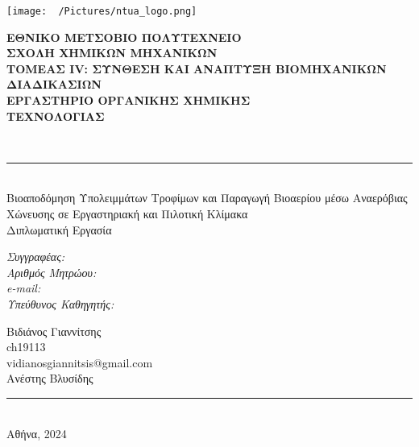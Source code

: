 \documentclass[11pt]{report}
\newcommand{\HRule}{\rule{\linewidth}{0.5mm}}
\begin{document}
\renewcommand{\contentsname}{Κεφάλαια: }
\begin{titlepage}

\begin{center}
  \begin{minipage}{0.2\textwidth}
    \begin{flushleft}
      \texttt{[image: ~/Pictures/ntua\_logo.png]}\\[0.4cm]    
    \end{flushleft}
  \end{minipage}
  \begin{minipage}{0.75\textwidth}
    \textsc{\bfseries \Large ΕΘΝΙΚΟ ΜΕΤΣΟΒΙΟ ΠΟΛΥΤΕΧΝΕΙΟ}\\[0.2cm]
    \textsc{\bfseries \Large ΣΧΟΛΗ ΧΗΜΙΚΩΝ ΜΗΧΑΝΙΚΩΝ}\\[0.2cm]
    \textsc{\large \bfseries ΤΟΜΕΑΣ IV: ΣΥΝΘΕΣΗ ΚΑΙ ΑΝΑΠΤΥΞΗ ΒΙΟΜΗΧΑΝΙΚΩΝ ΔΙΑΔΙΚΑΣΙΩΝ}\\[0.2cm]
    \textsc{\bfseries \large ΕΡΓΑΣΤΗΡΙΟ ΟΡΓΑΝΙΚΗΣ ΧΗΜΙΚΗΣ \\ ΤΕΧΝΟΛΟΓΙΑΣ}\\[0.2cm]
  \end{minipage}
  \\[2.5cm]

  \HRule \\[0.3cm]
  \Huge Βιοαποδόμηση Υπολειμμάτων Τροφίμων και Παραγωγή Βιοαερίου μέσω Αναερόβιας Χώνευσης σε Εργαστηριακή και Πιλοτική Κλίμακα\\[2.5cm]

  \huge Διπλωματική Εργασία \\[0.3cm]
   \begin{minipage}{0.4\textwidth}
    \begin{flushleft}
      \emph{\LARGE Συγγραφέας:}\\
	\emph{\LARGE Αριθμός Μητρώου:} \\
	\emph{\LARGE e-mail:} \\

	\emph{\LARGE Υπεύθυνος Καθηγητής:}
      \end{flushleft}
    \end{minipage}
    \begin{minipage}{0.4\textwidth}
      \begin{flushright} \large
	\LARGE Βιδιάνος Γιαννίτσης\\
	\LARGE ch19113\\
	\LARGE vidianosgiannitsis@gmail.com \\

	\LARGE Ανέστης Βλυσίδης
      \end{flushright}
    \end{minipage}
    \HRule \\[0.3cm]
  \vfill
{\LARGE Αθήνα, 2024}

\end{center}

\end{titlepage}
\end{document}
